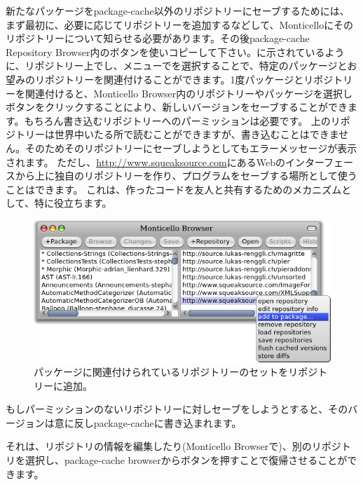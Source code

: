 \documentclass[a4paper,10pt,twoside]{book}
\begin{document}
新たなパッケージをpackage-cache以外のリポジトリーにセーブするためには、まず最初に、必要に応じてリポジトリーを追加するなどして、Monticelloにそのリポジトリーについて知らせる必要があります。その後package-cache Repository Browser内のボタンを使いコピーして下さい。に示されているように、リポジトリー上で\actclick し、メニューでを選択することで、特定のパッケージとお望みのリポジトリーを関連付けることができます。1度パッケージとリポジトリーを関連付けると、Monticello Browser内のリポジトリーやパッケージを選択しボタンをクリックすることにより、新しいバージョンをセーブすることができます。もちろん書き込むリポジトリーへのパーミッションは必要です。
\emphind{\sqsrc}上のリポジトリーは世界中いたる所で読むことができますが、書き込むことはできません。そのためそのリポジトリーにセーブしようとしてもエラーメッセージが表示されます。
ただし、\url{http://www.squeaksource.com}にあるWebのインターフェースから\sqsrc 上に独自のリポジトリーを作り、プログラムをセーブする場所として使うことはできます。
これは、作ったコードを友人と共有するためのメカニズムとして、特に役立ちます。

\begin{figure}[tbp]
	\begin{center}
		\includegraphics[width=\textwidth]{MCaddToPackage}
	\end{center}
	\caption{パッケージに関連付けられているリポジトリーのセットをリポジトリーに追加。}
\end{figure}

もしパーミッションのないリポジトリーに対しセーブをしようとすると、そのバージョンは意に反しpackage-cacheに書き込まれます。

それは、リポジトリの情報を編集したり(Monticello Browserで\actclick )、別のリポジトリを選択し、package-cache browserからボタンを押すことで復帰させることができます。
\end{document}
